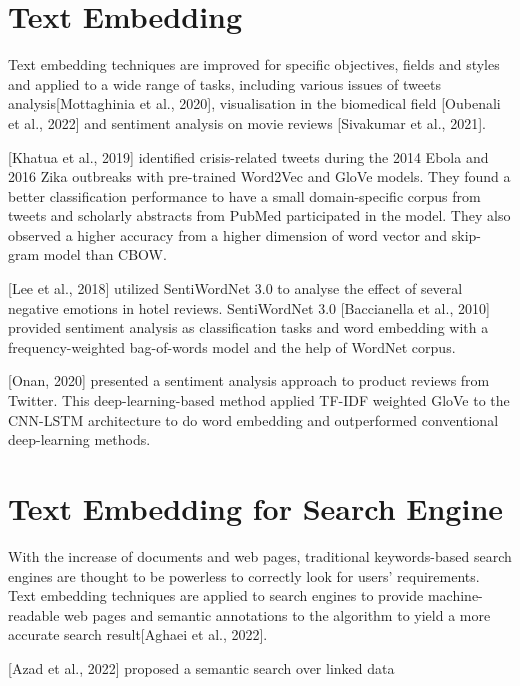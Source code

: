 \section{Text Embedding}
Text embedding techniques are improved for specific objectives, fields and styles and applied to a wide range of tasks, including various issues of tweets analysis[Mottaghinia et al., 2020], visualisation in the biomedical field [Oubenali et al., 2022] and sentiment analysis on movie reviews [Sivakumar et al., 2021].

[Khatua et al., 2019] identified crisis-related tweets during the 2014 Ebola and 2016 Zika outbreaks with pre-trained Word2Vec and GloVe models.
They found a better classification performance to have a small domain-specific corpus from tweets and scholarly abstracts from PubMed participated in the model.
They also observed a higher accuracy from a higher dimension of word vector and skip-gram model than CBOW.

[Lee et al., 2018] utilized SentiWordNet 3.0 to analyse the effect of several negative emotions in hotel reviews.
SentiWordNet 3.0 [Baccianella et al., 2010] provided sentiment analysis as classification tasks and word embedding with a frequency-weighted bag-of-words model and the help of WordNet corpus.

[Onan, 2020] presented a sentiment analysis approach to product reviews from Twitter.
This deep-learning-based method applied TF-IDF weighted GloVe to the CNN-LSTM architecture to do word embedding and outperformed conventional deep-learning methods.

\section{Text Embedding for Search Engine}
With the increase of documents and web pages, traditional keywords-based search engines are thought to be powerless to correctly look for users' requirements.
Text embedding techniques are applied to search engines to provide machine-readable web pages and semantic annotations to the algorithm to yield a more accurate search result[Aghaei et al., 2022].

[Azad et al., 2022] proposed a semantic search over linked data